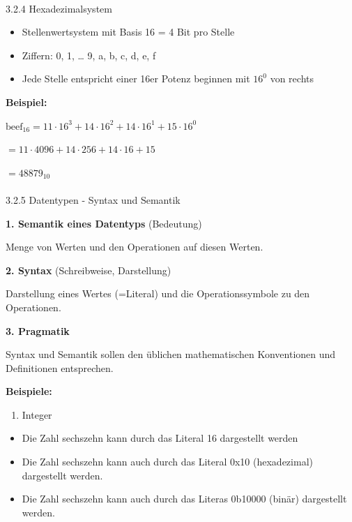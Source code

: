 \documentclass[
  11pt,
  a4paper,
  DIV=11,
  numbers=noendperiod]{scrartcl}
\makeatletter
\let\oldparagraph\paragraph
\renewcommand{\paragraph}{
    \@ifstar
      \xxxParagraphStar
      \xxxParagraphNoStar
  }
\newcommand{\xxxParagraphStar}[1]{\oldparagraph*{#1}\mbox{}}
\newcommand{\xxxParagraphNoStar}[1]{\oldparagraph{#1}\mbox{}}
\providecommand{\tightlist}{%
  \setlength{\itemsep}{0pt}\setlength{\parskip}{0pt}}\usepackage{longtable,booktabs,array}
\makeatother
\begin{document}
\paragraph{3.2.4 Hexadezimalsystem}\label{hexadezimalsystem}

\begin{itemize}
\tightlist
\item
  Stellenwertsystem mit Basis 16 = 4 Bit pro Stelle
\item
  Ziffern: 0, 1, \ldots{} 9, a, b, c, d, e, f
\item
  Jede Stelle entspricht einer 16er Potenz beginnen mit \(16^0\) von
  rechts
\end{itemize}

\textbf{Beispiel:}

\(\text{beef}_{16} = 11 \cdot 16^3 + 14 \cdot 16^2 +14 \cdot 16^1+ 15 \cdot 16^0\)

\(= 11 \cdot 4096 + 14 \cdot 256 + 14 \cdot 16+ 15\)

\(= 48879_{10}\)

\paragraph{3.2.5 Datentypen - Syntax und
Semantik}\label{datentypen---syntax-und-semantik}

\textbf{1. Semantik eines Datentyps} (Bedeutung)

Menge von Werten und den Operationen auf diesen Werten.

\textbf{2. Syntax} (Schreibweise, Darstellung)

Darstellung eines Wertes (=Literal) und die Operationssymbole zu den
Operationen.

\textbf{3. Pragmatik}

Syntax und Semantik sollen den üblichen mathematischen Konventionen und
Definitionen entsprechen.

\textbf{Beispiele:}

\begin{enumerate}
\def\labelenumi{\arabic{enumi}.}
\tightlist
\item
  Integer
\end{enumerate}

\begin{itemize}
\tightlist
\item
  Die Zahl sechszehn kann durch das Literal 16 dargestellt werden
\item
  Die Zahl sechszehn kann auch durch das Literal 0x10 (hexadezimal)
  dargestellt werden.
\item
  Die Zahl sechszehn kann auch durch das Literas 0b10000 (binär)
  dargestellt werden.
\end{itemize}
\end{document}
